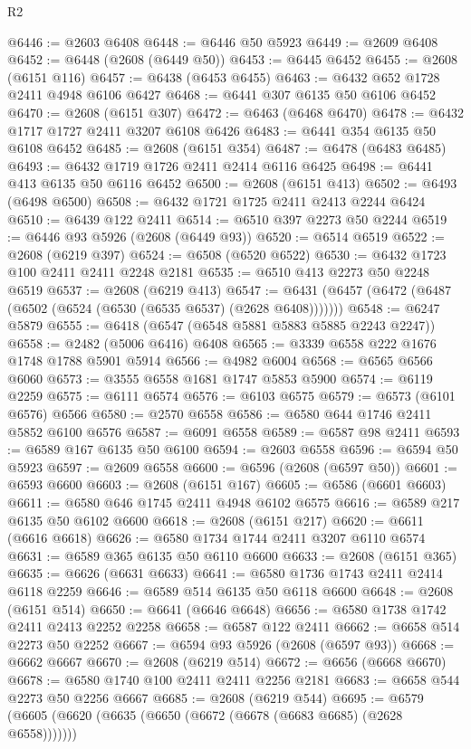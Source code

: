 \begin{lexlean}{R2}
\begin{coremodule}
@6446 := @2603 @6408
@6448 := @6446 @50 @5923
@6449 := @2609 @6408
@6452 := @6448 (@2608 (@6449 @50))
@6453 := @6445 @6452
@6455 := @2608 (@6151 @116)
@6457 := @6438 (@6453 @6455)
@6463 := @6432 @652 @1728 @2411 @4948 @6106 @6427
@6468 := @6441 @307 @6135 @50 @6106 @6452
@6470 := @2608 (@6151 @307)
@6472 := @6463 (@6468 @6470)
@6478 := @6432 @1717 @1727 @2411 @3207 @6108 @6426
@6483 := @6441 @354 @6135 @50 @6108 @6452
@6485 := @2608 (@6151 @354)
@6487 := @6478 (@6483 @6485)
@6493 := @6432 @1719 @1726 @2411 @2414 @6116 @6425
@6498 := @6441 @413 @6135 @50 @6116 @6452
@6500 := @2608 (@6151 @413)
@6502 := @6493 (@6498 @6500)
@6508 := @6432 @1721 @1725 @2411 @2413 @2244 @6424
@6510 := @6439 @122 @2411
@6514 := @6510 @397 @2273 @50 @2244
@6519 := @6446 @93 @5926 (@2608 (@6449 @93))
@6520 := @6514 @6519
@6522 := @2608 (@6219 @397)
@6524 := @6508 (@6520 @6522)
@6530 := @6432 @1723 @100 @2411 @2411 @2248 @2181
@6535 := @6510 @413 @2273 @50 @2248 @6519
@6537 := @2608 (@6219 @413)
@6547 := @6431 (@6457 (@6472 (@6487 (@6502 (@6524 (@6530 (@6535 @6537) (@2628 @6408)))))))
@6548 := @6247 @5879
@6555 := @6418 (@6547 (@6548 @5881 @5883 @5885 @2243 @2247))
@6558 := @2482 (@5006 @6416) @6408
@6565 := @3339 @6558 @222 @1676 @1748 @1788 @5901 @5914
@6566 := @4982 @6004
@6568 := @6565 @6566 @6060
@6573 := @3555 @6558 @1681 @1747 @5853 @5900
@6574 := @6119 @2259
@6575 := @6111 @6574
@6576 := @6103 @6575
@6579 := @6573 (@6101 @6576) @6566
@6580 := @2570 @6558
@6586 := @6580 @644 @1746 @2411 @5852 @6100 @6576
@6587 := @6091 @6558
@6589 := @6587 @98 @2411
@6593 := @6589 @167 @6135 @50 @6100
@6594 := @2603 @6558
@6596 := @6594 @50 @5923
@6597 := @2609 @6558
@6600 := @6596 (@2608 (@6597 @50))
@6601 := @6593 @6600
@6603 := @2608 (@6151 @167)
@6605 := @6586 (@6601 @6603)
@6611 := @6580 @646 @1745 @2411 @4948 @6102 @6575
@6616 := @6589 @217 @6135 @50 @6102 @6600
@6618 := @2608 (@6151 @217)
@6620 := @6611 (@6616 @6618)
@6626 := @6580 @1734 @1744 @2411 @3207 @6110 @6574
@6631 := @6589 @365 @6135 @50 @6110 @6600
@6633 := @2608 (@6151 @365)
@6635 := @6626 (@6631 @6633)
@6641 := @6580 @1736 @1743 @2411 @2414 @6118 @2259
@6646 := @6589 @514 @6135 @50 @6118 @6600
@6648 := @2608 (@6151 @514)
@6650 := @6641 (@6646 @6648)
@6656 := @6580 @1738 @1742 @2411 @2413 @2252 @2258
@6658 := @6587 @122 @2411
@6662 := @6658 @514 @2273 @50 @2252
@6667 := @6594 @93 @5926 (@2608 (@6597 @93))
@6668 := @6662 @6667
@6670 := @2608 (@6219 @514)
@6672 := @6656 (@6668 @6670)
@6678 := @6580 @1740 @100 @2411 @2411 @2256 @2181
@6683 := @6658 @544 @2273 @50 @2256 @6667
@6685 := @2608 (@6219 @544)
@6695 := @6579 (@6605 (@6620 (@6635 (@6650 (@6672 (@6678 (@6683 @6685) (@2628 @6558)))))))

\end{coremodule}
\end{lexlean}
